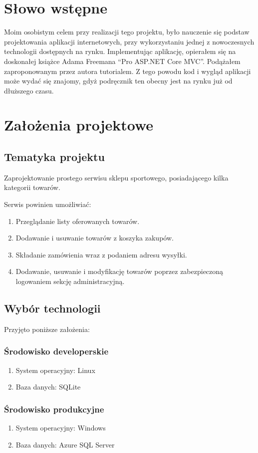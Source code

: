 \documentclass[a4paper,10pt]{article}
\begin{document}
\section{Słowo wstępne}
Moim osobistym celem przy realizacji tego projektu, było nauczenie się podstaw projektowania aplikacji internetowych, przy wykorzystaniu jednej z nowoczesnych technologii dostępnych na rynku. Implementując aplikację, opierałem się na doskonałej książce Adama Freemana ``Pro ASP.NET Core MVC''. Podążałem zaproponowanym przez autora tutorialem. Z tego powodu kod i wygląd aplikacji może wydać się znajomy, gdyż podręcznik ten obecny jest na rynku już od dłuższego czasu.

\section{Założenia projektowe}
\subsection{Tematyka projektu}
Zaprojektowanie prostego serwisu sklepu sportowego, posiadającego kilka kategorii towarów. 
\par
Serwis powinien umożliwiać:
\begin{enumerate}
 \item Przeglądanie listy oferowanych towarów.
 \item Dodawanie i usuwanie towarów z koszyka zakupów.
 \item Składanie zamówienia wraz z podaniem adresu wysyłki.
 \item Dodawanie, usuwanie i modyfikację towarów poprzez zabezpieczoną logowaniem sekcję administracyjną.
\end{enumerate}

\subsection{Wybór technologii}
Przyjęto poniższe założenia:
\subsubsection{Środowisko developerskie}
\begin{enumerate}
 \item System operacyjny: Linux
 \item Baza danych: SQLite
\end{enumerate}

\subsubsection{Środowisko produkcyjne}
\begin{enumerate}
 \item System operacyjny: Windows 
 \item Baza danych: Azure SQL Server
\end{enumerate}
\end{document}
